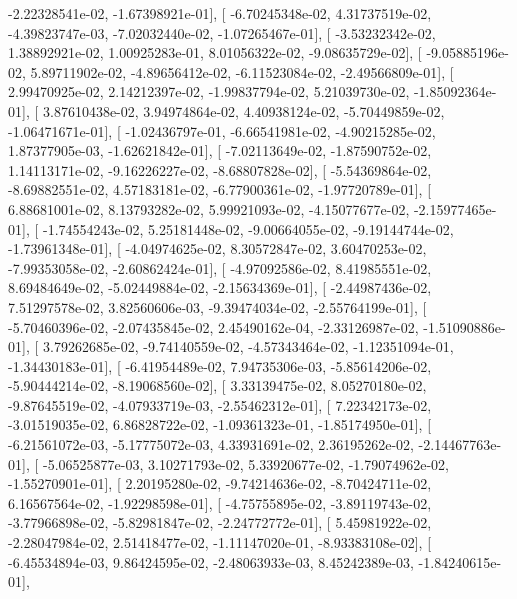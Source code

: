 \documentclass{article}
\begin{document}
         -2.22328541e-02,  -1.67398921e-01],
       [ -6.70245348e-02,   4.31737519e-02,  -4.39823747e-03,
         -7.02032440e-02,  -1.07265467e-01],
       [ -3.53232342e-02,   1.38892921e-02,   1.00925283e-01,
          8.01056322e-02,  -9.08635729e-02],
       [ -9.05885196e-02,   5.89711902e-02,  -4.89656412e-02,
         -6.11523084e-02,  -2.49566809e-01],
       [  2.99470925e-02,   2.14212397e-02,  -1.99837794e-02,
          5.21039730e-02,  -1.85092364e-01],
       [  3.87610438e-02,   3.94974864e-02,   4.40938124e-02,
         -5.70449859e-02,  -1.06471671e-01],
       [ -1.02436797e-01,  -6.66541981e-02,  -4.90215285e-02,
          1.87377905e-03,  -1.62621842e-01],
       [ -7.02113649e-02,  -1.87590752e-02,   1.14113171e-02,
         -9.16226227e-02,  -8.68807828e-02],
       [ -5.54369864e-02,  -8.69882551e-02,   4.57183181e-02,
         -6.77900361e-02,  -1.97720789e-01],
       [  6.88681001e-02,   8.13793282e-02,   5.99921093e-02,
         -4.15077677e-02,  -2.15977465e-01],
       [ -1.74554243e-02,   5.25181448e-02,  -9.00664055e-02,
         -9.19144744e-02,  -1.73961348e-01],
       [ -4.04974625e-02,   8.30572847e-02,   3.60470253e-02,
         -7.99353058e-02,  -2.60862424e-01],
       [ -4.97092586e-02,   8.41985551e-02,   8.69484649e-02,
         -5.02449884e-02,  -2.15634369e-01],
       [ -2.44987436e-02,   7.51297578e-02,   3.82560606e-03,
         -9.39474034e-02,  -2.55764199e-01],
       [ -5.70460396e-02,  -2.07435845e-02,   2.45490162e-04,
         -2.33126987e-02,  -1.51090886e-01],
       [  3.79262685e-02,  -9.74140559e-02,  -4.57343464e-02,
         -1.12351094e-01,  -1.34430183e-01],
       [ -6.41954489e-02,   7.94735306e-03,  -5.85614206e-02,
         -5.90444214e-02,  -8.19068560e-02],
       [  3.33139475e-02,   8.05270180e-02,  -9.87645519e-02,
         -4.07933719e-03,  -2.55462312e-01],
       [  7.22342173e-02,  -3.01519035e-02,   6.86828722e-02,
         -1.09361323e-01,  -1.85174950e-01],
       [ -6.21561072e-03,  -5.17775072e-03,   4.33931691e-02,
          2.36195262e-02,  -2.14467763e-01],
       [ -5.06525877e-03,   3.10271793e-02,   5.33920677e-02,
         -1.79074962e-02,  -1.55270901e-01],
       [  2.20195280e-02,  -9.74214636e-02,  -8.70424711e-02,
          6.16567564e-02,  -1.92298598e-01],
       [ -4.75755895e-02,  -3.89119743e-02,  -3.77966898e-02,
         -5.82981847e-02,  -2.24772772e-01],
       [  5.45981922e-02,  -2.28047984e-02,   2.51418477e-02,
         -1.11147020e-01,  -8.93383108e-02],
       [ -6.45534894e-03,   9.86424595e-02,  -2.48063933e-03,
          8.45242389e-03,  -1.84240615e-01],
\end{document}
